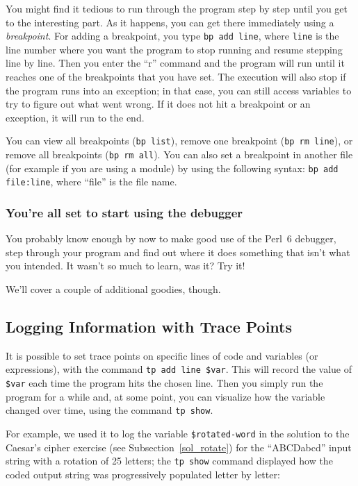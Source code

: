 You might find it tedious to run through the program step 
by step until you get to the interesting part. As it happens, 
you can get there immediately using a \emph{breakpoint}. For 
adding a breakpoint, you type {\tt bp add line}, where 
{\tt line} is the line number where you want the program to stop running 
and resume stepping line by line. Then you enter the ``r'' 
command and the program will run until it reaches one of the 
breakpoints that you have set. The execution will also 
stop if the program runs into an exception; in that case, 
you can still access variables to try to figure out what went 
wrong. If it does not hit a breakpoint or an exception, it 
will run to the end.

You can view all breakpoints ({\tt bp list}), remove 
one breakpoint ({\tt bp rm line}), or remove all breakpoints 
({\tt bp rm all}). You can also set a breakpoint in 
another file (for example if you are using a module) by 
using the following syntax: {\tt bp add file:line}, where 
``file'' is the file name.

\subsubsection{You're all set to start using the debugger}

You probably know enough by now to make good use of the Perl~6 
debugger, step through your program and find out where it 
does something that isn't what you intended. It wasn't so 
much to learn, was it? Try it!

We'll cover a couple of additional goodies, though. 

\subsection{Logging Information with Trace Points}

It is possible to set trace points on specific lines of code 
and variables (or expressions), with the command {\tt tp add 
line \$var}. This will record the value of \verb'$var' each 
time the program hits the chosen line. Then you simply run 
the program for a while and, at some point, you can visualize 
how the variable changed over time, using the command 
{\tt tp show}.

For example, we used it to log the variable \verb'$rotated-word' 
in the solution to the Caesar's cipher exercise 
(see Subsection~\ref{sol_rotate}) for the 
``ABCDabcd'' input string with a rotation of 25 letters; 
the {\tt tp show} command displayed how the coded output 
string was progressively populated letter by letter:

